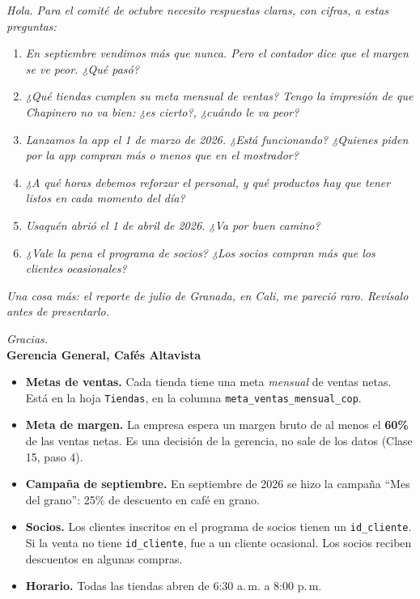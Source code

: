 \documentclass[11pt]{article}
\newcommand{\subtitulo}[1]{\par\needspace{3\baselineskip}\vspace{4pt}{\large\bfseries\color{esumerNavyDark} #1}\par}
\begin{document}
\begin{tcolorbox}[colback=white, colframe=esumerNavy, boxrule=0.8pt, arc=1mm,
  left=10pt, right=10pt, top=6pt, bottom=6pt]
\small
\textit{Hola. Para el comité de octubre necesito respuestas claras, con cifras,
a estas preguntas:}

\begin{enumerate}[label=\textbf{P\arabic*.}, leftmargin=2.2em, itemsep=3pt, topsep=4pt]
  \item \textit{En septiembre vendimos más que nunca. Pero el contador dice
    que el margen se ve peor. ¿Qué pasó?}
  \item \textit{¿Qué tiendas cumplen su meta mensual de ventas? Tengo la
    impresión de que Chapinero no va bien: ¿es cierto?, ¿cuándo le va peor?}
  \item \textit{Lanzamos la app el 1 de marzo de 2026. ¿Está funcionando? ¿Quienes
    piden por la app compran más o menos que en el mostrador?}
  \item \textit{¿A qué horas debemos reforzar el personal, y qué productos
    hay que tener listos en cada momento del día?}
  \item \textit{Usaquén abrió el 1 de abril de 2026. ¿Va por buen camino?}
  \item \textit{¿Vale la pena el programa de socios? ¿Los socios compran más
    que los clientes ocasionales?}
\end{enumerate}

\textit{Una cosa más: el reporte de julio de Granada, en Cali, me pareció
raro. Revísalo antes de presentarlo.}

\vspace{4pt}
\textit{Gracias.}\\
\textbf{Gerencia General, Cafés Altavista}
\end{tcolorbox}

\subtitulo{Lo que la gerencia ya sabe, y tú también}

\begin{itemize}[itemsep=2pt, topsep=2pt]
  \item \textbf{Metas de ventas.} Cada tienda tiene una meta \emph{mensual}
    de ventas netas. Está en la hoja \texttt{Tiendas}, en la columna
    \texttt{meta\_ventas\_mensual\_cop}.
  \item \textbf{Meta de margen.} La empresa espera un margen bruto de al
    menos el \textbf{60\%} de las ventas netas. Es una decisión de la
    gerencia, no sale de los datos (Clase 15, paso 4).
  \item \textbf{Campaña de septiembre.} En septiembre de 2026 se hizo la campaña
    ``Mes del grano'': 25\% de descuento en café en grano.
  \item \textbf{Socios.} Los clientes inscritos en el programa de socios
    tienen un \texttt{id\_cliente}. Si la venta no tiene \texttt{id\_cliente},
    fue a un cliente ocasional. Los socios reciben descuentos en algunas
    compras.
  \item \textbf{Horario.} Todas las tiendas abren de 6:30 a.\,m. a 8:00 p.\,m.
\end{itemize}
\end{document}
